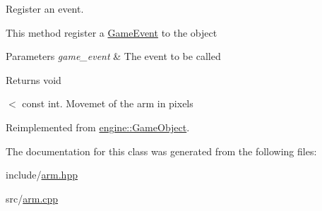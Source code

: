 Register an event. 

This method register a \hyperlink{class_game_event}{Game\+Event} to the object


\begin{DoxyParams}{Parameters}
{\em game\+\_\+event} & The event to be called\\
\hline
\end{DoxyParams}
\begin{DoxyReturn}{Returns}
void 
\end{DoxyReturn}
$<$ const int. Movemet of the arm in pixels 

Reimplemented from \hyperlink{classengine_1_1_game_object}{engine\+::\+Game\+Object}.



The documentation for this class was generated from the following files\+:\begin{DoxyCompactItemize}
\item 
include/\hyperlink{arm_8hpp}{arm.\+hpp}\item 
src/\hyperlink{arm_8cpp}{arm.\+cpp}\end{DoxyCompactItemize}
